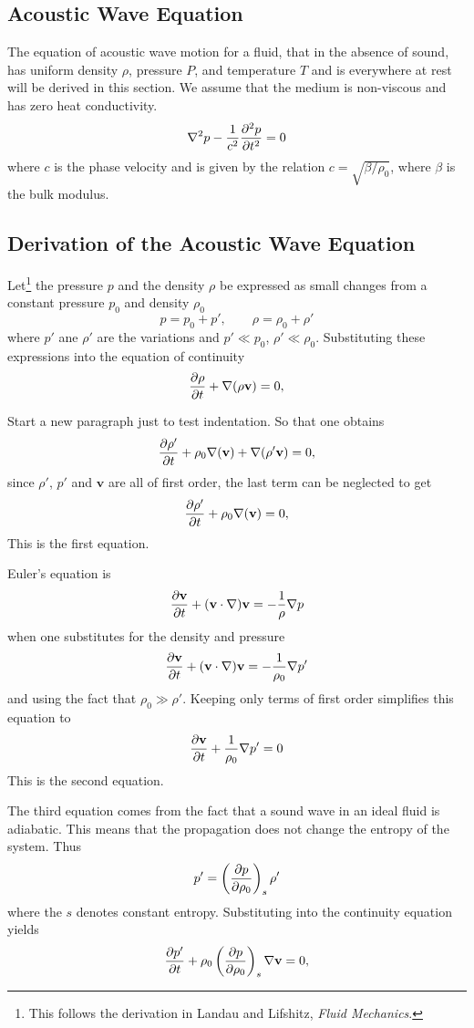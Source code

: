 ﻿\documentclass{article}
\begin{document}
\subsection{Acoustic Wave Equation}

The equation of acoustic wave motion for a fluid, that in the absence of sound,
has uniform density $\rho$, pressure $P$, and temperature $T$ and is everywhere
at rest will be derived in this section.  We assume that the medium is non-viscous
and has zero heat conductivity.  
$$
\nabla^2p-\frac{1}{c^2} {\partial^2 p \over \partial t^2} = 0
\label{eqn:lineareuler}
$$
where $c$ is the phase velocity and is given by the relation $c= \sqrt{\beta/\rho_0}$, where $\beta$ is the
bulk modulus.

\subsection{Derivation of the Acoustic Wave Equation}

Let\footnote{This follows the derivation in Landau and Lifshitz, \textit{Fluid Mechanics}.}
the pressure $p$ and the density $\rho$ be expressed as small changes
from a constant pressure $p_0$ and density $\rho_0$
$$
p = p_0 + p', \qquad \rho = \rho_0 + \rho'
$$
where $p'$ ane $\rho'$ are the variations and $p'\ll p_0$, $\rho'\ll\rho_0$.
Substituting these expressions into the equation of continuity
$$
{\partial \rho\over\partial t} + \nabla(\rho \mathbf{v}) = 0,
$$

Start a new paragraph just to test indentation.  So that one obtains
$$
{\partial \rho'\over\partial t} + \rho_0\nabla(\mathbf{v}) + \nabla(\rho'\mathbf{v}) = 0,
$$
since $\rho'$, $p'$ and $\mathbf{v}$ are all of first order, the last term can
be neglected to get
$$
{\partial \rho'\over\partial t} + \rho_0\nabla(\mathbf{v}) = 0,
$$
This is the first equation.

Euler's equation is
$$
{\partial\mathbf{v}\over\partial t} + (\mathbf{v} \cdot \nabla)\mathbf{v} = -{1\over\rho} \nabla p
$$
when one substitutes for the density and pressure
$$
{\partial\mathbf{v}\over\partial t} + (\mathbf{v} \cdot \nabla)\mathbf{v} = -{1\over\rho_0} \nabla p'
$$
and using the fact that $\rho_0\gg\rho'$.  Keeping only terms of first order
simplifies this equation to
$$
{\partial\mathbf{v}\over\partial t} + {1\over\rho_0} \nabla p'=0
$$
This is the second equation.

The third equation comes from the fact that a sound wave in an ideal
fluid is adiabatic.  This means that the propagation does not change
the entropy of the system.  Thus
$$
p' = \left({\partial p \over \partial \rho_0}\right)_s  \rho'
$$
where the $s$ denotes constant entropy.  Substituting into the continuity equation yields
$$
{\partial p'\over\partial t} + \rho_0\left({\partial p\over \partial \rho_0}\right)_s\nabla\mathbf{v} = 0,
$$
\end{document}
